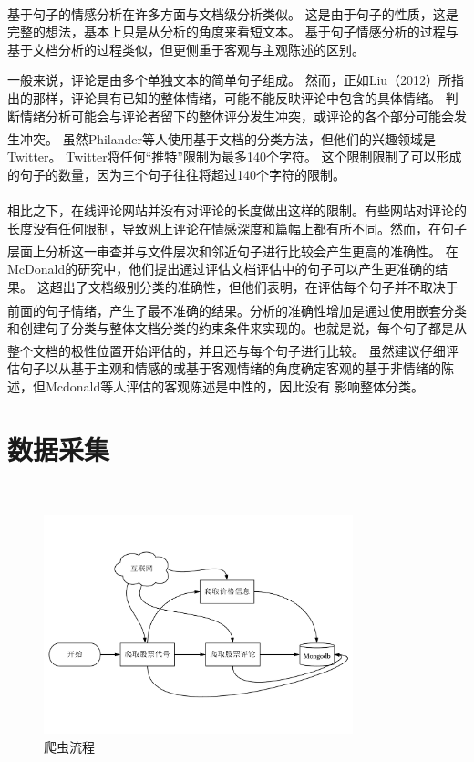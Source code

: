 \documentclass[cs4size,a4paper]{ctexart}
\numberwithin{equation}{section}
\numberwithin{table}{section}
\numberwithin{figure}{section}
\newcommand{\upcite}[1]{\textsuperscript{\textsuperscript{\cite{#1}}}}%
\begin{document}
基于句子的情感分析在许多方面与文档级分析类似\upcite{liu2012sentiment}。 这是由于句子的性质，这是完整的想法，基本上只是从分析的角度来看短文本。 基于句子情感分析的过程与基于文档分析的过程类似，但更侧重于客观与主观陈述的区别。

一般来说，评论是由多个单独文本的简单句子组成。 然而，正如Liu（2012）所指出的那样，评论具有已知的整体情绪，可能不能反映评论中包含的具体情绪。 判断情绪分析可能会与评论者留下的整体评分发生冲突，或评论的各个部分可能会发生冲突。 虽然Philander等人\upcite{philander2016twitter}使用基于文档的分类方法，但他们的兴趣领域是Twitter。 Twitter将任何“推特”限制为最多140个字符。 这个限制限制了可以形成的句子的数量，因为三个句子往往将超过140个字符的限制。

相比之下，在线评论网站并没有对评论的长度做出这样的限制\upcite{sparks2011impact}。有些网站对评论的长度没有任何限制，导致网上评论在情感深度和篇幅上都有所不同。然而，在句子层面上分析这一审查并与文件层次和邻近句子进行比较会产生更高的准确性\upcite{mcdonald2007structured}。 在McDonald的研究中，他们提出通过评估文档评估中的句子可以产生更准确的结果。 这超出了文档级别分类的准确性，但他们表明，在评估每个句子并不取决于前面的句子情绪，产生了最不准确的结果\upcite{mcdonald2007structured}。分析的准确性增加是通过使用嵌套分类和创建句子分类与整体文档分类的约束条件来实现的。也就是说，每个句子都是从整个文档的极性位置开始评估的，并且还与每个句子进行比较。 虽然\upcite{liu2012sentiment}建议仔细评估句子以从基于主观和情感的或基于客观情绪的角度确定客观的基于非情绪的陈述，但Mcdonald等人评估的客观陈述是中性的，因此没有 影响整体分类。

\section{数据采集}~\label{数据采集}

\begin{figure}[thbp!]
  \centering
  \includegraphics[width=0.8\textwidth]{figure/spiderProcess.pdf}
  \caption{爬虫流程}\label{fig:spiderPrecess}
\end{figure}
\end{document}

